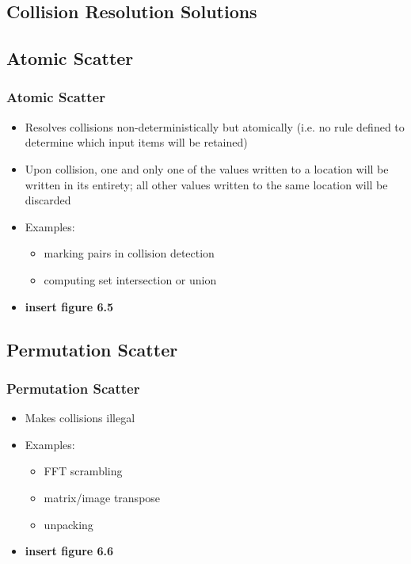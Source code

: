 \documentclass[xcolor=dvipsnames]{beamer}
\begin{document}
	\subsection{Collision Resolution Solutions}
	
		\subsection*{Atomic Scatter}
		\begin{frame} \frametitle{Atomic Scatter}
			\begin{itemize}
				\item Resolves collisions non-deterministically but atomically (i.e. no rule defined to determine which input items will be retained)
				\item Upon collision, one and only one of the values written to a location will be written in its entirety; all other values written to the same location will be discarded
				\item Examples:
					\begin{itemize}
						\item marking pairs in collision detection
						\item computing set intersection or union 
					\end{itemize}
				\item \textbf{insert figure 6.5}
			\end{itemize}
		\end{frame}
	
		\subsection*{Permutation Scatter}
		\begin{frame} \frametitle{Permutation Scatter}
			\begin{itemize}
				\item Makes collisions illegal
				\item Examples:
					\begin{itemize}
						\item FFT scrambling
						\item matrix/image transpose
						\item unpacking
					\end{itemize}
				\item \textbf{insert figure 6.6}
			\end{itemize}
		\end{frame}
	
\end{document}
